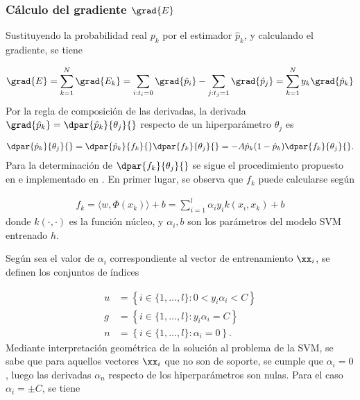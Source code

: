 %
\subsubsection{Cálculo del gradiente $\grad{E}$}
%


Sustituyendo la probabilidad real $p_k$ por el estimador
$\hat{p}_k$, y calculando el gradiente, se tiene

\begin{align}
\label{gradE}
  \grad{E} = \sum_{k=1}^{N} \grad{E_k} =
  \sum_{ i:t_i=0  } \grad{\hat{p}_i}
  - \sum_{ j:t_j=1  } \grad{\hat{p}_j}
  = \sum_{k=1}^{N} y_k \grad{\hat{p}_k}
\end{align}
Por la regla de composición de las derivadas, la derivada
$\grad{\hat{p}_k}=\dpar{\hat{p}_k}{\theta_j}{}$ respecto de un
hiperparámetro ${\theta_j}$ es

\begin{align}
  \dpar{\hat{p}_k}{\theta_j}{} =
  \dpar{\hat{p}_k}{f_k}{}\dpar{f_k}{\theta_j}{} =
  -A\hat{p}_k(1-\hat{p}_k)\dpar{f_k}{\theta_j}{}.
  \label{eq:deriv-pk-thetak}
\end{align}
Para la determinación de $\dpar{f_k}{\theta_j}{}$ se sigue el
procedimiento propuesto en \cite{keerthi,glasmachers} e implementado
en \cite{shark}.
En primer lugar, se observa que $f_k$ puede calcularse según

\begin{align}
  f_k = \langle w,\Phi(x_k)\rangle+b = \sum_{i=1}^l \alpha_i y_i k(x_i,x_k) + b
  \label{fk}
\end{align}
donde $k(\cdot,\cdot)$ es la función núcleo, y $\alpha_i, b$ son los
parámetros del modelo SVM entrenado $h$.

Según sea el valor de $\alpha_i$ correspondiente al vector de
entrenamiento $\xx_i$, se definen los conjuntos de índices

\begin{align}
  \label{unbounded-sv-set}
  u &= \left\{i\in\{1,\ldots,l\}:0<y_i\alpha_i<C \right\}\\
  \label{bounded-sv-set}
  g &= \left\{i\in\{1,\ldots,l\}: y_i\alpha_i=C \right\}\\
  n &= \left\{i\in\{1,\ldots,l\}: \alpha_i=0 \right\}.
\end{align}
Mediante interpretación geométrica de la solución al problema de la
SVM, se sabe que para aquellos vectores $\xx_i$ que no son de soporte,
se cumple que $\alpha_i=0$, luego las derivadas $\alpha_n$ respecto de los
hiperparámetros son nulas. Para el caso $\alpha_i=\pm{}C$, se tiene

